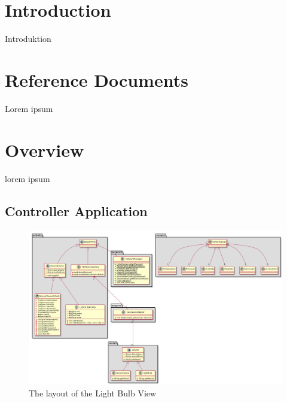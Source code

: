 \documentclass[a4paper]{article}
\begin{document}
\tableofcontents
\newpage
{}

\section{Introduction}
Introduktion

\section{Reference Documents}
Lorem ipsum


\section{Overview}
lorem ipsum

\subsection{Controller Application}
\begin{figure}[H]
    \centering
    \includegraphics[width=1\textwidth]{class_diagram.png}
    \caption{The layout of the Light Bulb View}
    \label{fig:mylightbulbview}
\end{figure}
\end{document}
